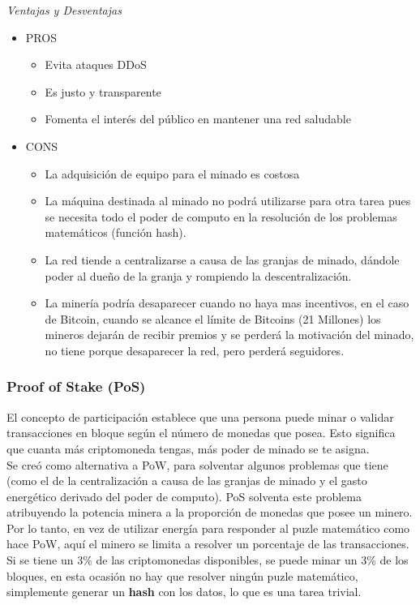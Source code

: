 \emph{Ventajas y Desventajas}
\begin{itemize}
\item PROS
  \begin{itemize}
  \item Evita ataques DDoS
  \item Es justo y transparente
  \item Fomenta el interés del público en mantener una red saludable
  \end{itemize}
\item CONS
  \begin{itemize}
  \item La adquisición de equipo para el minado es costosa
  \item La máquina destinada al minado no podrá utilizarse para otra tarea pues se necesita todo el poder de computo en la resolución de los problemas matemáticos (función hash).
  \item La red tiende a centralizarse a causa de las granjas de minado, dándole poder al dueño de la granja y rompiendo la descentralización.
  \item La minería podría desaparecer cuando no haya mas incentivos, en el caso de Bitcoin, cuando se alcance el límite de Bitcoins (21 Millones) los mineros dejarán de recibir premios y se perderá la motivación del minado, no tiene porque desaparecer la red, pero perderá seguidores.
  \end{itemize}
\end{itemize}

\subsubsection{Proof of Stake (PoS)}

El concepto de participación establece que una persona puede minar o validar transacciones en bloque según el número de monedas que posea. Esto significa que cuanta más criptomoneda tengas, más poder de minado se te asigna. \\ 

Se creó como alternativa a PoW, para solventar algunos problemas que tiene (como el de la centralización a causa de las granjas de minado y el gasto energético derivado del poder de computo). PoS solventa este problema atribuyendo la potencia minera a la proporción de monedas que posee un minero. Por lo tanto, en vez de utilizar energía para responder al puzle matemático como hace PoW, aquí el minero se limita a resolver un porcentaje de las transacciones. Si se tiene un 3\% de las criptomonedas disponibles, se puede minar un 3\% de los bloques, en esta ocasión no hay que resolver ningún puzle matemático, simplemente generar un \textbf{hash} con los datos, lo que es una tarea trivial. \\

